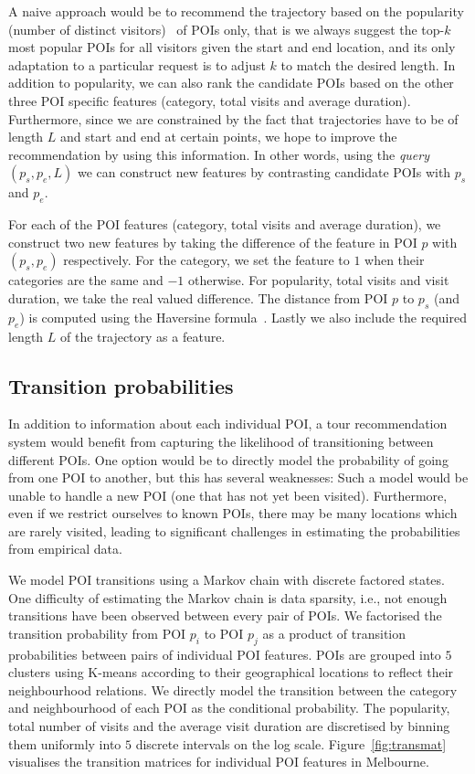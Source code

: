 A naive approach would be to recommend the trajectory based on the popularity (number of distinct visitors)~\cite{ht10} of POIs only,
that is we always suggest the top-$k$ most popular POIs for all visitors given the start and end location, 
and its only adaptation to a particular request is to adjust $k$ to match the desired length.
In addition to popularity, 
we can also rank the candidate POIs based on the other three POI specific features (category, total visits and average duration).
Furthermore, since we are constrained by the fact that trajectories have to be of length $L$ and start and end at certain points, we hope to improve the recommendation by using this information.
In other words, using the \textit{query} $(p_s, p_e, L)$ we can construct new features by contrasting candidate POIs with $p_s$ and $p_e$.

For each of the POI features (category, total visits and average duration),
we construct two new features by taking the difference of the feature in POI $p$ with $(p_s, p_e)$ respectively.
For the category, we set the feature to $1$ when their categories are the same and $-1$ otherwise.
For popularity, total visits and visit duration, we take the real valued difference.
The distance from POI $p$ to $p_s$ (and $p_e$) is computed using the Haversine formula~\cite{haversine}.
Lastly we also include the required length $L$ of the trajectory as a feature.



\subsection{Transition probabilities}
\label{sec:transition}

In addition to information about each individual POI, a tour recommendation system would benefit
from capturing the likelihood of transitioning between different POIs. One option would be to
directly model the probability of going from one POI to another, but this has several weaknesses:
Such a model would be unable to handle a new POI (one that has not yet been visited).
Furthermore, even if we restrict ourselves to known POIs, there may be many locations which
are rarely visited, leading to significant challenges in estimating the probabilities from
empirical data.

We model POI transitions using a Markov chain with discrete factored states.
One difficulty of estimating the Markov chain is data sparsity, 
i.e., not enough transitions have been observed between every pair of POIs. 
We factorised the transition probability from POI $p_i$ to POI $p_j$ %
as a product of transition probabilities between pairs of individual POI features.
POIs are grouped into $5$ clusters using K-means according to their geographical locations
to reflect their neighbourhood relations.
We directly model the transition between the category and neighbourhood of each POI as the conditional probability.
The popularity, total number of visits and the average visit duration are discretised by binning
them uniformly into $5$ discrete intervals on the log scale.
Figure~\ref{fig:transmat} visualises the transition matrices for individual POI features in Melbourne.

